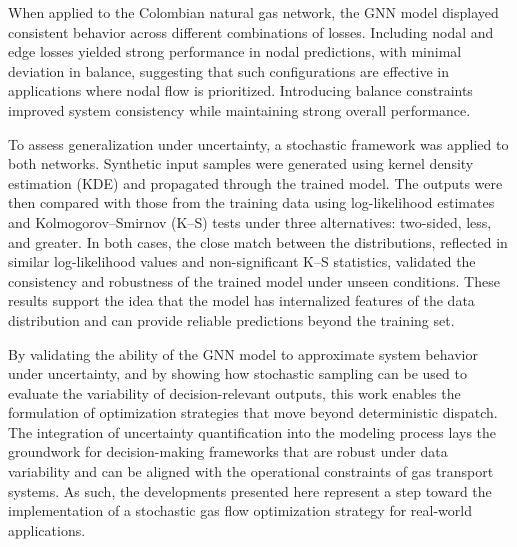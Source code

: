 When applied to the Colombian natural gas network, the GNN model displayed consistent behavior across different combinations of losses. Including nodal and edge losses yielded strong performance in nodal predictions, with minimal deviation in balance, suggesting that such configurations are effective in applications where nodal flow is prioritized. Introducing balance constraints improved system consistency while maintaining strong overall performance.

To assess generalization under uncertainty, a stochastic framework was applied to both networks. Synthetic input samples were generated using kernel density estimation (KDE) and propagated through the trained model. The outputs were then compared with those from the training data using log-likelihood estimates and Kolmogorov–Smirnov (K–S) tests under three alternatives: two-sided, less, and greater. In both cases, the close match between the distributions, reflected in similar log-likelihood values and non-significant K–S statistics, validated the consistency and robustness of the trained model under unseen conditions. These results support the idea that the model has internalized features of the data distribution and can provide reliable predictions beyond the training set.


By validating the ability of the GNN model to approximate system behavior under uncertainty, and by showing how stochastic sampling can be used to evaluate the variability of decision-relevant outputs, this work enables the formulation of optimization strategies that move beyond deterministic dispatch. The integration of uncertainty quantification into the modeling process lays the groundwork for decision-making frameworks that are robust under data variability and can be aligned with the operational constraints of gas transport systems. As such, the developments presented here represent a step toward the implementation of a stochastic gas flow optimization strategy for real-world applications.


